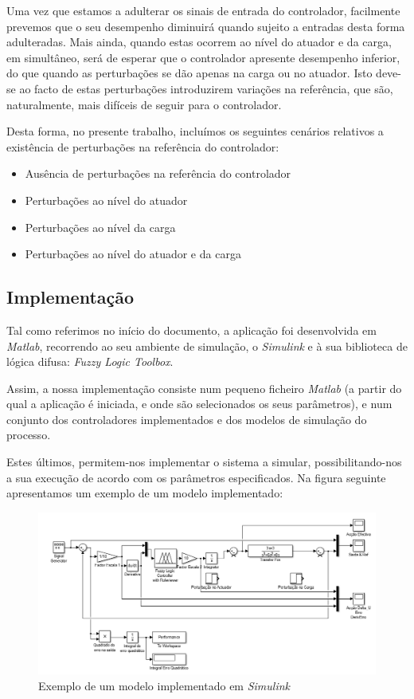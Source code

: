 \documentclass{article}
\begin{document}
Uma vez que estamos a adulterar os sinais de entrada do controlador, facilmente prevemos que o seu desempenho diminuirá quando sujeito a entradas desta forma adulteradas. Mais ainda, quando estas ocorrem ao nível do atuador e da carga, em simultâneo, será de esperar que o controlador apresente desempenho inferior, do que quando as perturbações se dão apenas na carga ou no atuador. Isto deve-se ao facto de estas perturbações introduzirem variações na referência, que são, naturalmente, mais difíceis de seguir para o controlador.

Desta forma, no presente trabalho, incluímos os seguintes cenários relativos a existência de perturbações na referência do controlador:

\begin{itemize}
\item Ausência de perturbações na referência do controlador
\item Perturbações ao nível do atuador
\item Perturbações ao nível da carga
\item Perturbações ao nível do atuador e da carga
\end{itemize}


\subsection{Implementação}

Tal como referimos no início do documento, a aplicação foi desenvolvida em \emph{Matlab}, recorrendo ao seu ambiente de simulação, o \emph{Simulink} e à sua biblioteca de lógica difusa: \emph{Fuzzy Logic Toolbox}.

Assim, a nossa implementação consiste num pequeno ficheiro \emph{Matlab} (a partir do qual a aplicação é iniciada, e onde são selecionados os seus parâmetros), e num conjunto dos controladores implementados e dos modelos de simulação do processo.

Estes últimos, permitem-nos implementar o sistema a simular, possibilitando-nos a sua execução de acordo com os parâmetros especificados. Na figura seguinte apresentamos um exemplo de um modelo implementado:

\begin{figure}[H]
  \centering
      \includegraphics[scale=0.5]{Images/Controller_example.png}
  \caption{Exemplo de um modelo implementado em \emph{Simulink}}
\end{figure}
\end{document}
